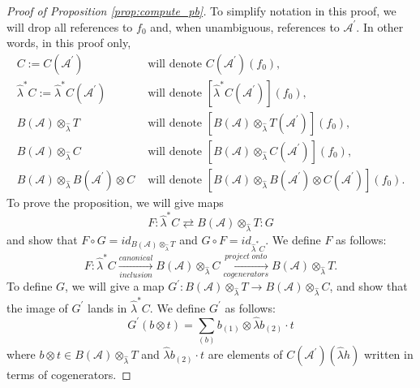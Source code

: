 \begin{proof}[Proof of Proposition \ref{prop:compute_pb}]
To simplify notation in this proof, 
we will drop all references to $f_0$ and,
when unambiguous, references to $\mathcal{A}^\prime$. 
In other words, in this proof only,
\begin{align*}
C := C(\mathcal{A}^\prime) 
&\textrm{ will denote } C(\mathcal{A}^\prime)(f_0), \\
\hat{\lambda}^*C := \hat{\lambda}^*C(\mathcal{A}^\prime) 
&\textrm{ will denote } [\hat{\lambda}^*C(\mathcal{A}^\prime)](f_0), \\
B(\mathcal{A}) \otimes_{\hat{\lambda}} T 
&\textrm{ will denote } [B(\mathcal{A}) \otimes_{\hat{\lambda}} T(\mathcal{A}^\prime)](f_0), \\
B(\mathcal{A}) \otimes_{\hat{\lambda}} C 
&\textrm{ will denote } [B(\mathcal{A}) \otimes_{\hat{\lambda}} C(\mathcal{A}^\prime)](f_0), \\
B(\mathcal{A}) \otimes_{\hat{\lambda}} B(\mathcal{A}^\prime) \otimes C 
&\textrm{ will denote } 
[B(\mathcal{A}) \otimes_{\hat{\lambda}} B(\mathcal{A}^\prime) \otimes C(\mathcal{A}^\prime)](f_0).
\end{align*}
%
To prove the proposition, 
we will give maps
$$
F: \hat{\lambda}^*C \rightleftarrows B(\mathcal{A}) \otimes_{\hat{\lambda}} T:G
$$
and show that $F\circ G = id_{B(\mathcal{A}) \otimes_{\hat{\lambda}} T}$ 
and $G \circ F = id_{\hat{\lambda}^*C}$.
We define $F$ as follows: 
$$
F:\hat{\lambda}^*C 
\xrightarrow[inclusion]{canonical}
B(\mathcal{A}) \otimes_{\hat{\lambda}} C
\xrightarrow[cogenerators]{project\;onto}
B(\mathcal{A}) \otimes_{\hat{\lambda}} T.
$$
To define $G$, we will give a map 
$G^\prime: B(\mathcal{A}) \otimes_{\hat{\lambda}} T \to 
B(\mathcal{A}) \otimes_{\hat{\lambda}} C$, and show that the image of 
$G^\prime$ lands in $\hat{\lambda}^*C$. We define 
$G^\prime$ as follows:
$$
G^\prime(b \otimes t) = 
\sum \limits_{(b)} b_{(1)} \otimes \hat{\lambda} b_{(2)} \cdot t
$$
where $b \otimes t \in B(\mathcal{A}) \otimes_{\hat{\lambda}} T$ and $\hat{\lambda} 
b_{(2)} \cdot t$ are elements of $C(\mathcal{A}^\prime)(\hat{\lambda} h)$ 
written in terms of cogenerators.


\end{proof}
